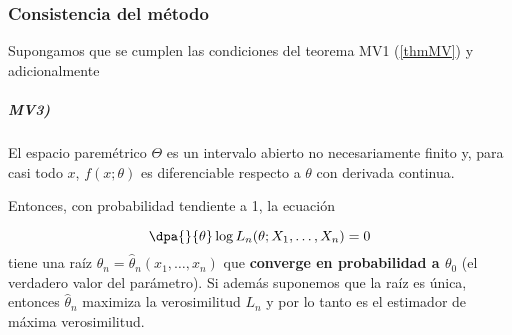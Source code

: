 \documentclass{apuntes}
\begin{document}
\subsubsection{Consistencia del método}

\begin{theorem}[Teorema\IS MV2]\label{thmMV2} Supongamos que se cumplen las condiciones del teorema MV1 (\ref{thmMV}) y adicionalmente

\subparagraph{MV3)} El espacio paremétrico $\Theta$ es un intervalo abierto no necesariamente finito y, para casi todo $x$, $f(x;\theta)$ es diferenciable respecto a $\theta$ con derivada continua.

Entonces, con probabilidad tendiente a 1, la ecuación

\begin{equation}
 \dpa{}{\theta} \log L_n (\theta;X_1,\dotsc,X_n) = 0 \label{eqMV2}
\end{equation}
tiene una raíz $\hat\theta_n = \hat\theta_n(x_1,\dotsc,x_n)$ que \textbf{converge en probabilidad a $\theta_0$} (el verdadero valor del parámetro). Si además suponemos que la raíz es única, entonces $\hat\theta_n$ maximiza la verosimilitud $L_n$ y por lo tanto es el estimador de máxima verosimilitud.
\end{theorem}
\end{document}
